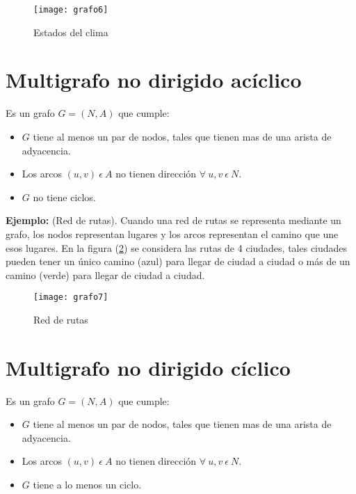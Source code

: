 \documentclass[a4paper, 11pt]{article}
\begin{document}
\begin{figure}[H]
  \centering
    \texttt{[image: grafo6]}
  \caption{Estados del clima}
  \label{imagen6}
\end{figure}






\section*{Multigrafo no dirigido acíclico }

Es un grafo $G = (N, A)$ que cumple:
\begin{itemize}
\item $G$ tiene al menos un par de nodos, tales que tienen mas de una arista de adyacencia.
\item Los arcos $(u, v) \ \epsilon \ A$ no tienen dirección $\forall \ u, v \ \epsilon \ N$.
\item $G$ no tiene ciclos.
\end{itemize}


\textbf{Ejemplo:} (Red de rutas). Cuando una red de rutas se representa mediante un grafo, los nodos representan lugares y los arcos representan el camino que une esos lugares. En la figura (\ref{imagen7}) se considera las rutas de 4 ciudades, tales ciudades pueden tener un único camino (azul) para llegar de ciudad a ciudad o más de un camino (verde) para llegar de ciudad a ciudad.


\begin{figure}[H]
  \centering
    \texttt{[image: grafo7]}
  \caption{Red de rutas}
  \label{imagen7}
\end{figure}




\section*{Multigrafo no dirigido cíclico }


Es un grafo $G = (N, A)$ que cumple:
\begin{itemize}
\item $G$ tiene al menos un par de nodos, tales que tienen mas de una arista de adyacencia.
\item Los arcos $(u, v) \ \epsilon \ A$ no tienen dirección $\forall \ u, v \ \epsilon \ N$.
\item $G$ tiene a lo menos un ciclo.
\end{itemize}
\end{document}
